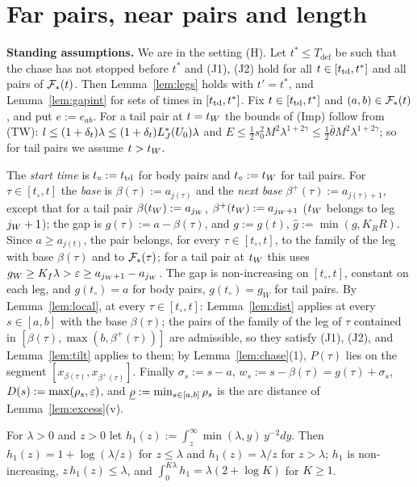 \section{Far pairs, near pairs and length}\label{sec:farnear}

\noindent\textbf{Standing assumptions.} We are in the setting (H). Let $t^*\le T_{\mathrm{def}}$ be such that the chase has not
stopped before $t^*$ and (J1), (J2) hold for all $t\in[t_{\mathrm{td}},t^*]$ and all pairs of $\mathcal F_*(t)$. Then Lemma~\ref{lem:legs} holds with
$t'=t^*$, and Lemma~\ref{lem:gapint} for sets of times in $[t_{\mathrm{td}},t^*]$. Fix $t\in[t_{\mathrm{td}},t^*]$ and $(a,b)\in\mathcal F_*(t)$, and put
$e:=e_{ab}$. For a tail pair at $t=t_W$ the bounds of (Imp) follow from (TW): $l\le(1+\delta_t)\lambda\le(1+\delta_t)L^*_J(U_0)\lambda$
and $E\le\frac12s_0^2M^2\lambda^{1+2\gamma}\le\frac12\bar\theta M^2\lambda^{1+2\gamma}$; so for tail pairs we assume $t>t_W$.

The \emph{start time} is $t_\circ:=t_{\mathrm{td}}$ for body pairs and $t_\circ:=t_W$ for tail pairs. For $\tau\in[t_\circ,t]$ the \emph{base} is
$\beta(\tau):=a_{j(\tau)}$ and the \emph{next base} $\beta^+(\tau):=a_{j(\tau)+1}$, except that for a tail pair $\beta(t_W):=a_{j_W}$,
$\beta^+(t_W):=a_{j_W+1}$ ($t_W$ belongs to leg $j_W+1$); the gap is $g(\tau):=a-\beta(\tau)$, and $g:=g(t)$, $\hat g:=\min(g,K_RR)$.
Since $a\ge a_{j(t)}$, the pair belongs, for every $\tau\in[t_\circ,t]$, to the family of the leg with base $\beta(\tau)$ and to
$\mathcal F_*(\tau)$; for a tail pair at $t_W$ this uses $g_W\ge K_f\lambda>\varepsilon\ge a_{j_W+1}-a_{j_W}$. The gap is non-increasing on
$[t_\circ,t]$, constant on each leg, and $g(t_\circ)=a$ for body pairs, $g(t_\circ)=g_W$ for tail pairs. By
Lemma~\ref{lem:local}, at every $\tau\in[t_\circ,t]$: Lemma~\ref{lem:dist} applies at every $s\in[a,b]$ with the base $\beta(\tau)$;
the pairs of the family of the leg of $\tau$ contained in $[\beta(\tau),\max(b,\beta^+(\tau))]$ are admissible, so they satisfy (J1),
(J2), and Lemma~\ref{lem:tilt} applies to them; by Lemma~\ref{lem:chase}(1), $P(\tau)$ lies on the segment
$[x_{\beta(\tau)},x_{\beta^+(\tau)}]$. Finally $\sigma_s:=s-a$, $w_s:=s-\beta(\tau)=g(\tau)+\sigma_s$, $D(s):=\max(\rho_s,\varepsilon)$, and
$\underline\rho:=\min_{s\in[a,b]}\rho_s$ is the arc distance of Lemma~\ref{lem:excess}(v).

\begin{lemma}[An integral]\label{lem:int}
For $\lambda>0$ and $z>0$ let $h_1(z):=\int_z^\infty\min(\lambda,y)\,y^{-2}dy$. Then $h_1(z)=1+\log(\lambda/z)$ for $z\le\lambda$ and
$h_1(z)=\lambda/z$ for $z>\lambda$; $h_1$ is non-increasing, $z\,h_1(z)\le\lambda$, and $\int_0^{K\lambda}h_1=\lambda(2+\log K)$ for
$K\ge1$.
\end{lemma}

